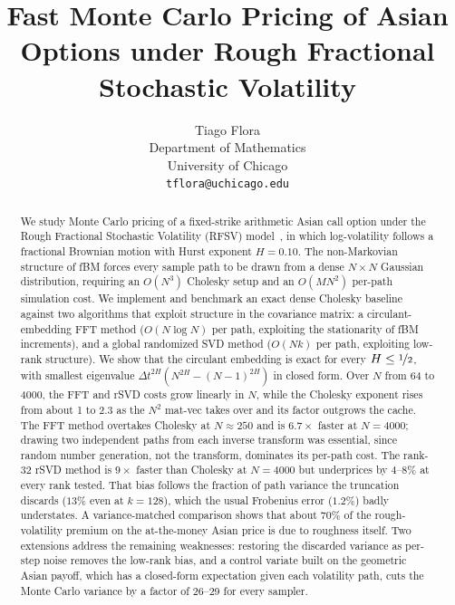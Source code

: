 \documentclass{article}
\title{Fast Monte Carlo Pricing of Asian Options under Rough Fractional Stochastic Volatility}
\author{%
  Tiago Flora \\
  Department of Mathematics \\
  University of Chicago \\
  \texttt{tflora@uchicago.edu}
}
\begin{document}
\maketitle

\begin{abstract}
We study Monte Carlo pricing of a fixed-strike arithmetic Asian call option under the
Rough Fractional Stochastic Volatility (RFSV) model~\citep{gatheral2018volatility},
in which log-volatility follows a fractional Brownian motion with Hurst exponent
$H = 0.10$.  The non-Markovian structure of fBM forces every sample path to be drawn
from a dense $N \times N$ Gaussian distribution, requiring an $O(N^3)$ Cholesky setup
and an $O(MN^2)$ per-path simulation cost.  We implement and benchmark an exact dense
Cholesky baseline against two algorithms that exploit structure in the covariance
matrix: a circulant-embedding FFT method ($O(N \log N)$ per path, exploiting the
stationarity of fBM increments), and a global randomized SVD method ($O(Nk)$ per
path, exploiting low-rank structure).  We show that the circulant embedding is exact
for every $H \leq \nicefrac{1}{2}$, with smallest eigenvalue
$\Delta t^{2H}(N^{2H} - (N-1)^{2H})$ in closed form.  Over $N$ from 64 to 4000, the FFT
and rSVD costs grow linearly in $N$, while the Cholesky exponent rises from about 1 to
2.3 as the $N^2$ mat-vec takes over and its factor outgrows the cache.  The FFT method
overtakes Cholesky at $N \approx 250$ and is $6.7\times$ faster at $N = 4000$; drawing
two independent paths from each inverse transform was essential, since random number
generation, not the transform, dominates its per-path cost.  The rank-32 rSVD method is
$9\times$ faster than Cholesky at $N = 4000$ but underprices by $4$--$8\%$ at every
rank tested.  That bias follows the fraction of path variance the truncation discards
($13\%$ even at $k = 128$), which the usual Frobenius error ($1.2\%$) badly understates.
A variance-matched comparison shows that about 70\% of the rough-volatility premium on
the at-the-money Asian price is due to roughness itself.  Two extensions address the
remaining weaknesses: restoring the discarded variance as per-step noise removes the
low-rank bias, and a control variate built on the geometric Asian payoff, which has a
closed-form expectation given each volatility path, cuts the Monte Carlo variance by a
factor of 26--29 for every sampler.
\end{abstract}









\end{document}
